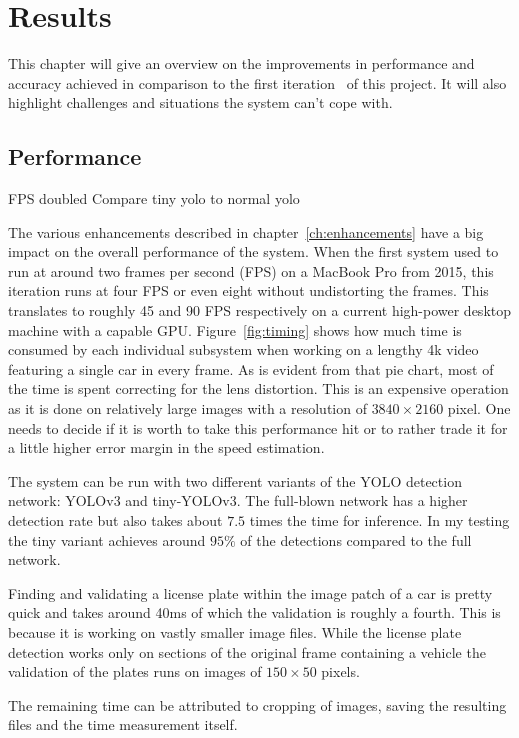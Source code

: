 \chapter{Results} \label{cha:Results}

This chapter will give an overview on the improvements in performance and accuracy achieved in comparison to the first iteration~\cite{Berger2018} of this project.
It will also highlight challenges and situations the system can't cope with.

\section{Performance}
FPS doubled
Compare tiny yolo to normal yolo

The various enhancements described in chapter~\ref{ch:enhancements} have a big impact on the overall performance of the system.
When the first system used to run at around two frames per second (FPS) on a MacBook Pro from 2015, this iteration runs at four FPS or even eight without undistorting the frames.
This translates to roughly 45 and 90 FPS respectively on a current high-power desktop machine with a capable GPU\@.
Figure~\ref{fig:timing} shows how much time is consumed by each individual subsystem when working on a lengthy 4k video featuring a single car in every frame.
As is evident from that pie chart, most of the time is spent correcting for the lens distortion.
This is an expensive operation as it is done on relatively large images with a resolution of $3840 \times 2160$ pixel.
One needs to decide if it is worth to take this performance hit or to rather trade it for a little higher error margin in the speed estimation.

The system can be run with two different variants of the YOLO detection network: YOLOv3 and tiny-YOLOv3.
The full-blown network has a higher detection rate but also takes about $7.5$ times the time for inference.
In my testing the tiny variant achieves around $95\%$ of the detections compared to the full network.

Finding and validating a license plate within the image patch of a car is pretty quick and takes around 40ms of which the validation is roughly a fourth.
This is because it is working on vastly smaller image files.
While the license plate detection works only on sections of the original frame containing a vehicle the validation of the plates runs on images of $150 \times 50$ pixels.

The remaining time can be attributed to cropping of images, saving the resulting files and the time measurement itself.

